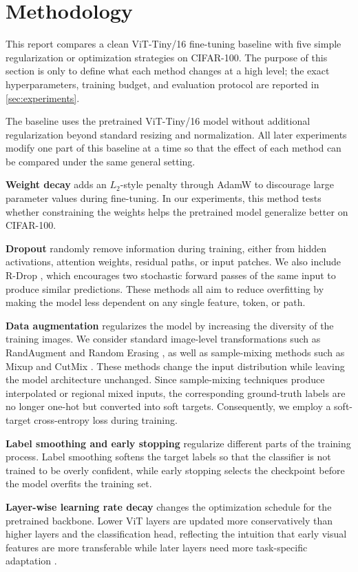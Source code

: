 \section{Methodology}
\label{sec:methodology}

This report compares a clean ViT-Tiny/16 fine-tuning baseline with five
simple regularization or optimization strategies on CIFAR-100. The purpose
of this section is only to define what each method changes at a high level;
the exact hyperparameters, training budget, and evaluation protocol are
reported in \cref{sec:experiments}.

The baseline uses the pretrained ViT-Tiny/16 model without additional
regularization beyond standard resizing and normalization.
\label{sec:method:baseline}
All later experiments modify one part of this baseline at a time so that the
effect of each method can be compared under the same general setting.

\textbf{Weight decay} adds an $L_2$-style penalty through AdamW to discourage
large parameter values during fine-tuning.
\label{sec:method:wd}
In our experiments, this method tests whether constraining the weights helps
the pretrained model generalize better on CIFAR-100.

\textbf{Dropout} randomly remove information during training,
either from hidden activations, attention weights, residual paths, or input
patches.
\label{sec:method:dropout}
We also include R-Drop \citep{wu2021r}, which encourages two stochastic
forward passes of the same input to produce similar predictions. These methods
all aim to reduce overfitting by making the model less dependent on any single
feature, token, or path.

\textbf{Data augmentation} regularizes the model by increasing the diversity of
the training images.
\label{sec:method:aug}
We consider standard image-level transformations such as RandAugment
\citep{cubuk2020randaugment} and Random Erasing \citep{zhong2020random}, as
well as sample-mixing methods such as Mixup \citep{zhang2018mixup} and CutMix
\citep{yun2019cutmix}. These methods change the input distribution while
leaving the model architecture unchanged. Since sample-mixing techniques produce interpolated or regional mixed inputs, the corresponding ground-truth labels are no longer one-hot but converted into soft targets. Consequently, we employ a soft-target cross-entropy loss during training.

\textbf{Label smoothing and early stopping} regularize different parts of the
training process.
\label{sec:method:lsearly}
Label smoothing softens the target labels so that the classifier is not trained
to be overly confident, while early stopping selects the checkpoint before the
model overfits the training set.

\textbf{Layer-wise learning rate decay} changes the optimization schedule for
the pretrained backbone.
\label{sec:method:llrd}
Lower ViT layers are updated more conservatively than higher layers and the
classification head, reflecting the intuition that early visual features are
more transferable while later layers need more task-specific adaptation
\citep{dong2022exploring,liu2022convnext}.
